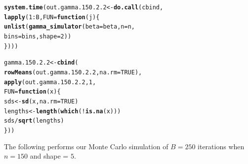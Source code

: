 \documentclass[11pt]{article}\usepackage[]{graphicx}\usepackage[]{color}
\makeatletter
\newcommand{\hlnum}[1]{\textcolor[rgb]{0.686,0.059,0.569}{#1}}%
\newcommand{\hlopt}[1]{\textcolor[rgb]{0,0,0}{#1}}%
\newcommand{\hlstd}[1]{\textcolor[rgb]{0.345,0.345,0.345}{#1}}%
\newcommand{\hlkwa}[1]{\textcolor[rgb]{0.161,0.373,0.58}{\textbf{#1}}}%
\newcommand{\hlkwb}[1]{\textcolor[rgb]{0.69,0.353,0.396}{#1}}%
\newcommand{\hlkwc}[1]{\textcolor[rgb]{0.333,0.667,0.333}{#1}}%
\newcommand{\hlkwd}[1]{\textcolor[rgb]{0.737,0.353,0.396}{\textbf{#1}}}%
\newenvironment{kframe}{%
 \def\at@end@of@kframe{}%
 \ifinner\ifhmode%
  \def\at@end@of@kframe{\end{minipage}}%
  \begin{minipage}{\columnwidth}%
 \fi\fi%
 \def\FrameCommand##1{\hskip\@totalleftmargin \hskip-\fboxsep
 \colorbox{shadecolor}{##1}\hskip-\fboxsep
     \hskip-\linewidth \hskip-\@totalleftmargin \hskip\columnwidth}%
 \MakeFramed {\advance\hsize-\width
   \@totalleftmargin\z@ \linewidth\hsize
   \@setminipage}}%
 {\par\unskip\endMakeFramed%
 \at@end@of@kframe}
\newenvironment{knitrout}{}{} %
\makeatother
\begin{document}
\begin{knitrout}
\color{fgcolor}\begin{kframe}
\begin{alltt}
\hlkwd{system.time}\hlstd{(out.gamma.150.2.2} \hlkwb{<-} \hlkwd{do.call}\hlstd{(cbind,}
  \hlkwd{lapply}\hlstd{(}\hlnum{1}\hlopt{:}\hlstd{B,} \hlkwc{FUN} \hlstd{=} \hlkwa{function}\hlstd{(}\hlkwc{j}\hlstd{)\{}
    \hlkwd{unlist}\hlstd{(}\hlkwd{gamma_simulator}\hlstd{(}\hlkwc{beta} \hlstd{= beta,} \hlkwc{n} \hlstd{= n,}
      \hlkwc{bins} \hlstd{= bins,} \hlkwc{shape} \hlstd{=} \hlnum{2}\hlstd{))}
\hlstd{\})))}
\end{alltt}


{\ttfamily\noindent\bfseries\color{errorcolor}{\#\# Error in eval(family\$initialize): non-positive values not allowed for the 'gamma' family}}

{\ttfamily\noindent\itshape\color{messagecolor}{\#\# Timing stopped at: 0.003 0 0.003}}\end{kframe}
\end{knitrout}

\begin{knitrout}
\color{fgcolor}\begin{kframe}
\begin{alltt}
\hlstd{gamma.150.2.2} \hlkwb{<-} \hlkwd{cbind}\hlstd{(}
  \hlkwd{rowMeans}\hlstd{(out.gamma.150.2.2,} \hlkwc{na.rm} \hlstd{=} \hlnum{TRUE}\hlstd{),}
  \hlkwd{apply}\hlstd{(out.gamma.150.2.2,} \hlnum{1}\hlstd{,}
  \hlkwc{FUN} \hlstd{=} \hlkwa{function}\hlstd{(}\hlkwc{x}\hlstd{)\{}
    \hlstd{sds} \hlkwb{<-} \hlkwd{sd}\hlstd{(x,} \hlkwc{na.rm} \hlstd{=} \hlnum{TRUE}\hlstd{)}
    \hlstd{lengths} \hlkwb{<-} \hlkwd{length}\hlstd{(}\hlkwd{which}\hlstd{(}\hlopt{!}\hlkwd{is.na}\hlstd{(x)))}
    \hlstd{sds} \hlopt{/} \hlkwd{sqrt}\hlstd{(lengths)}
  \hlstd{\}))}
\end{alltt}


{\ttfamily\noindent\bfseries\color{errorcolor}{\#\# Error in is.data.frame(x): object 'out.gamma.150.2.2' not found}}\end{kframe}
\end{knitrout}

The following performs our Monte Carlo simulation of $B = 250$ iterations 
when $n = 150$ and shape = $5$.
\end{document}
